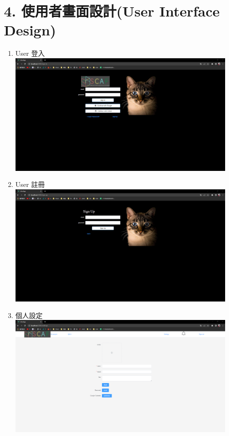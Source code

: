 \documentclass{report}
\begin{document}
\section*{4. 使用者畫面設計(User Interface Design)}


\begin{enumerate}
	\item User 登入 \\ \includegraphics[width=0.9\textwidth]{assets/UI/signin.png}
	\item User 註冊 \\ \includegraphics[width=0.9\textwidth]{assets/UI/signup.png}
	\item 個人設定 \\ \includegraphics[width=0.9\textwidth]{assets/UI/settings.png}

\end{enumerate}
\end{document}
